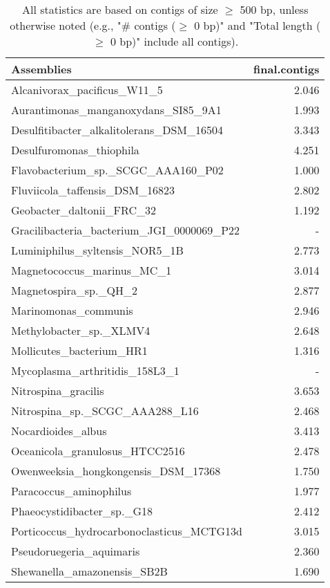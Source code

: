 \documentclass[12pt,a4paper]{article}
\begin{document}
\begin{table}[ht]
\begin{center}
\caption{All statistics are based on contigs of size $\geq$ 500 bp, unless otherwise noted (e.g., "\# contigs ($\geq$ 0 bp)" and "Total length ($\geq$ 0 bp)" include all contigs).}
\begin{tabular}{|l*{1}{|r}|}
\hline
Assemblies & final.contigs \\ \hline
Alcanivorax\_pacificus\_W11\_5 & 2.046 \\ \hline
Aurantimonas\_manganoxydans\_SI85\_9A1 & 1.993 \\ \hline
Desulfitibacter\_alkalitolerans\_DSM\_16504 & 3.343 \\ \hline
Desulfuromonas\_thiophila & 4.251 \\ \hline
Flavobacterium\_sp.\_SCGC\_AAA160\_P02 & 1.000 \\ \hline
Fluviicola\_taffensis\_DSM\_16823 & 2.802 \\ \hline
Geobacter\_daltonii\_FRC\_32 & 1.192 \\ \hline
Gracilibacteria\_bacterium\_JGI\_0000069\_P22 & - \\ \hline
Luminiphilus\_syltensis\_NOR5\_1B & 2.773 \\ \hline
Magnetococcus\_marinus\_MC\_1 & 3.014 \\ \hline
Magnetospira\_sp.\_QH\_2 & 2.877 \\ \hline
Marinomonas\_communis & 2.946 \\ \hline
Methylobacter\_sp.\_XLMV4 & 2.648 \\ \hline
Mollicutes\_bacterium\_HR1 & 1.316 \\ \hline
Mycoplasma\_arthritidis\_158L3\_1 & - \\ \hline
Nitrospina\_gracilis & 3.653 \\ \hline
Nitrospina\_sp.\_SCGC\_AAA288\_L16 & 2.468 \\ \hline
Nocardioides\_albus & 3.413 \\ \hline
Oceanicola\_granulosus\_HTCC2516 & 2.478 \\ \hline
Owenweeksia\_hongkongensis\_DSM\_17368 & 1.750 \\ \hline
Paracoccus\_aminophilus & 1.977 \\ \hline
Phaeocystidibacter\_sp.\_G18 & 2.412 \\ \hline
Porticoccus\_hydrocarbonoclasticus\_MCTG13d & 3.015 \\ \hline
Pseudoruegeria\_aquimaris & 2.360 \\ \hline
Shewanella\_amazonensis\_SB2B & 1.690 \\ \hline

\end{tabular}
\end{center}
\end{table}
\end{document}
